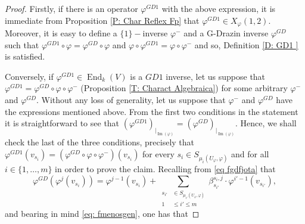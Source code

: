 \documentclass[10pt,a4paper]{amsart}
\theoremstyle{plain}
\theoremstyle{remark}
\numberwithin{equation}{section} \numberwithin{defn}{section}
\newcommand\ed{\operatorname{End}}
\newcommand{\Img}{\operatorname{Im}}
\newcommand{\f}{\varphi}
\begin{document}
\begin{proof}
Firstly, if there is an operator $\f^{GD1}$ with the above expression, it is immediate from Proposition \ref{P: Char Reflex Fp} that $\f^{GD1}\in X_{\f}(1,2).$ Moreover, it is easy to define a $\{1\}-$inverse $\f^-$ and a G-Drazin inverse $\f^{GD}$ such that $\f^{GD1}\circ \f=\f^{GD}\circ \f$ and $\f \circ \f^{GD1}=\f\circ \f^-$ and so, Definition \ref{D: GD1 } is satisfied.


Conversely, if $\f^{GD1}\in \ed_k(V)$ is a $GD1$ inverse, let us suppose that $\f^{GD1}=\f^{GD}\circ \f \circ \f^{-}$ (Proposition \ref{T: Charact Algebraica}) for some arbitrary $\f^{-}$ and $\f^{GD}.$ Without any loss of generality, let us suppose that $\f^-$ and $\f^{GD}$ have the expressions mentioned above. From the first two conditions in the statement it is straightforward to see that $(\f^{GD1})_{\vert_{\Img(\f)}}=(\f^{GD})_{\vert_{\Img(\f)}}.$ Hence, we shall check the last of the three conditions, precisely that $\f^{GD1}(v_{s_i})=(\f^{GD}\circ \f \circ \f^-)(v_{s_i})$ for every $s_i\in S_{{\mu}_i (U_\varphi, \varphi)}$ and for all $i\in \{1,\dots,m\}$ in order to prove the claim. Recalling from \eqref{eq fgdfjota} that $$ \f^{GD}(\f^j(v_{s_i}))=\f^{j-1}(v_{s_i})+\underset {\begin{aligned} s_{i'} &\in S_{{\mu}_{i'} (U_\varphi, \varphi)} \\ 1 &\leq i' \leq m \end{aligned}} \sum \beta_{s_{i'}}^{s_i,j}\cdot \varphi^{i'-1} ({{v_{s_{i'}}}}), $$\noindent
 and bearing in mind \eqref{eq: fmenosgen}, one has that 


\end{proof}
\end{document}
